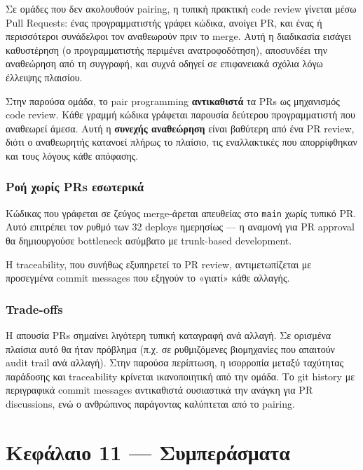Σε ομάδες που δεν ακολουθούν pairing, η τυπική πρακτική code review
γίνεται μέσω Pull Requests: ένας προγραμματιστής γράφει κώδικα, ανοίγει
PR, και ένας ή περισσότεροι συνάδελφοι τον αναθεωρούν πριν το merge.
Αυτή η διαδικασία εισάγει καθυστέρηση (ο προγραμματιστής περιμένει
ανατροφοδότηση), αποσυνδέει την αναθεώρηση από τη συγγραφή, και συχνά
οδηγεί σε επιφανειακά σχόλια λόγω έλλειψης πλαισίου.

Στην παρούσα ομάδα, το pair programming \textbf{αντικαθιστά} τα PRs ως
μηχανισμός code review. Κάθε γραμμή κώδικα γράφεται παρουσία δεύτερου
προγραμματιστή που αναθεωρεί άμεσα. Αυτή η \textbf{συνεχής αναθεώρηση}
είναι βαθύτερη από ένα PR review, διότι ο αναθεωρητής κατανοεί πλήρως το
πλαίσιο, τις εναλλακτικές που απορρίφθηκαν και τους λόγους κάθε
απόφασης.

\subsection{Ροή χωρίς PRs
εσωτερικά}\label{ux3c1ux3bfux3ae-ux3c7ux3c9ux3c1ux3afux3c2-prs-ux3b5ux3c3ux3c9ux3c4ux3b5ux3c1ux3b9ux3baux3ac}

Κώδικας που γράφεται σε ζεύγος merge-άρεται απευθείας στο \texttt{main}
χωρίς τυπικό PR. Αυτό επιτρέπει τον ρυθμό των 32 deploys ημερησίως --- η
αναμονή για PR approval θα δημιουργούσε bottleneck ασύμβατο με
trunk-based development.

Η traceability, που συνήθως εξυπηρετεί το PR review, αντιμετωπίζεται με
προσεγμένα commit messages που εξηγούν το «γιατί» κάθε αλλαγής.

\subsection{Trade-offs}\label{trade-offs}

Η απουσία PRs σημαίνει λιγότερη τυπική καταγραφή ανά αλλαγή. Σε ορισμένα
πλαίσια αυτό θα ήταν πρόβλημα (π.χ. σε ρυθμιζόμενες βιομηχανίες που
απαιτούν audit trail ανά αλλαγή). Στην παρούσα περίπτωση, η ισορροπία
μεταξύ ταχύτητας παράδοσης και traceability κρίνεται ικανοποιητική από
την ομάδα. Το git history με περιγραφικά commit messages αντικαθιστά
ουσιαστικά την ανάγκη για PR discussions, ενώ ο ανθρώπινος παράγοντας
καλύπτεται από το pairing.

\chapter{Κεφάλαιο 11 ---
Συμπεράσματα}\label{ux3baux3b5ux3c6ux3acux3bbux3b1ux3b9ux3bf-11-ux3c3ux3c5ux3bcux3c0ux3b5ux3c1ux3acux3c3ux3bcux3b1ux3c4ux3b1}

